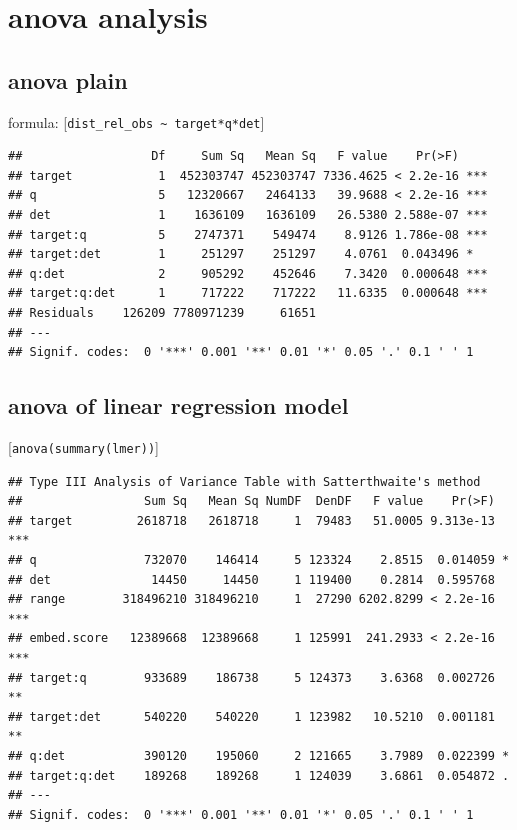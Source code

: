 \documentclass[12pt,a4paper]{article}
\begin{document}
\section{anova analysis}\label{anova-analysis}

\subsection{anova plain}\label{anova-plain}

formula: {[}\texttt{dist\_rel\_obs\ \textasciitilde{}\ target*q*det}{]}

\begin{verbatim}
##                  Df     Sum Sq   Mean Sq   F value    Pr(>F)    
## target            1  452303747 452303747 7336.4625 < 2.2e-16 ***
## q                 5   12320667   2464133   39.9688 < 2.2e-16 ***
## det               1    1636109   1636109   26.5380 2.588e-07 ***
## target:q          5    2747371    549474    8.9126 1.786e-08 ***
## target:det        1     251297    251297    4.0761  0.043496 *  
## q:det             2     905292    452646    7.3420  0.000648 ***
## target:q:det      1     717222    717222   11.6335  0.000648 ***
## Residuals    126209 7780971239     61651                        
## ---
## Signif. codes:  0 '***' 0.001 '**' 0.01 '*' 0.05 '.' 0.1 ' ' 1
\end{verbatim}

\subsection{anova of linear regression model}\label{anova-of-linear-regression-model}

{[}\texttt{anova(summary(lmer))}{]}

\begin{verbatim}
## Type III Analysis of Variance Table with Satterthwaite's method
##                 Sum Sq   Mean Sq NumDF  DenDF   F value    Pr(>F)    
## target         2618718   2618718     1  79483   51.0005 9.313e-13 ***
## q               732070    146414     5 123324    2.8515  0.014059 *  
## det              14450     14450     1 119400    0.2814  0.595768    
## range        318496210 318496210     1  27290 6202.8299 < 2.2e-16 ***
## embed.score   12389668  12389668     1 125991  241.2933 < 2.2e-16 ***
## target:q        933689    186738     5 124373    3.6368  0.002726 ** 
## target:det      540220    540220     1 123982   10.5210  0.001181 ** 
## q:det           390120    195060     2 121665    3.7989  0.022399 *  
## target:q:det    189268    189268     1 124039    3.6861  0.054872 .  
## ---
## Signif. codes:  0 '***' 0.001 '**' 0.01 '*' 0.05 '.' 0.1 ' ' 1
\end{verbatim}
\end{document}
